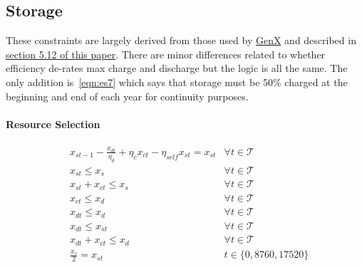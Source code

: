 \documentclass[9pt, oneside]{article}
\numberwithin{equation}{subsubsection}
\begin{document}
\subsection{Storage}\label{subsec:storage}
These constraints are largely derived from those used by \href{https://github.com/GenXProject/GenX.jl}{GenX} and described in
\href{https://energy.mit.edu/wp-content/uploads/2017/10/Enhanced-Decision-Support-for-a-Changing-Electricity-Landscape.pdf}{section 5.12 of this paper}.
There are minor differences related to whether efficiency de-rates max charge and discharge but the logic is all the same.
The only addition is~\ref{eqn:es7} which says that storage must be 50\% charged at the beginning and end of each year for continuity purposes.

\paragraph{Resource Selection}
\begin{subequations}
	\begin{align}
		 & x_{st-1} - \frac{ x_{dt}}{\eta_d} + \eta_c x_{ct} - \eta_{self} x_{st} = x_{st} & \forall t \in \mathcal{T} \label{eqn:es0} \\
		 & x_{st} \leq x_s                                                                 & \forall t \in \mathcal{T} \label{eqn:es1} \\
		 & x_{st}+ x_{ct} \leq x_s                                                         & \forall t \in \mathcal{T} \label{eqn:es2} \\
		 & x_{ct} \leq x_d                                                                 & \forall t \in \mathcal{T} \label{eqn:es3} \\
		 & x_{dt} \leq x_d                                                                 & \forall t \in \mathcal{T} \label{eqn:es4} \\
		 & x_{dt} \leq x_{st}                                                              & \forall t \in \mathcal{T} \label{eqn:es5} \\
		 & x_{dt} + x_{ct} \leq x_d                                                        & \forall t \in \mathcal{T} \label{eqn:es6} \\
		 & \frac{ x_{s}}{2} = x_{st}                                                       & t \in \{0, 8760,17520\}\label{eqn:es7}
	\end{align}
\end{subequations}
\end{document}
